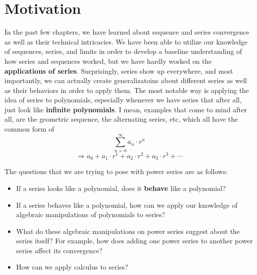 \section{Motivation}
In the past few chapters, we have learned about
sequence and series convergence as well as
their technical intricacies. We have been able to utilize
our knowledge of sequences, series, and limits in order
to develop a baseline understanding of how series and
sequences worked, but we have hardly worked on the
\textbf{applications of series}. Surprisingly, series
show up everywhere, and most importantly, we can
actually create generalizatoins about different series
as well as their behaviors in order to apply them.
The most notable way is applying the idea of series to
polynomials, especially whenever we have series that
after all, just look like \textbf{infinite polynomials}.
I mean, examples that come to mind after all,
are the geometric sequence, the alternating series, etc,
which all have the common form of
\[ \sum_{n=0}^{\infty} a_{n} \cdot r^{n} \]
\[ \Rightarrow a_{0} + a_{1} \cdot r^{1} +
  a_{2} \cdot r^{2} + a_{3} \cdot r^{3} + \cdots \]

The questions that we are trying to pose with power series
are as follows:
\begin{itemize}
  \item If a series looks like a polynomial, does it
        \textbf{behave} like a polynomial?
  \item If a series behaves like a polynomial, how
        can we apply our knowledge of algebraic manipulations
        of polynomials to series?
  \item What do these algebraic manipulations on
        power series suggest about the series itself?
        For example, how does adding one power series
        to another power series affect its
        convergence?
  \item How can we apply calculus to series?

\end{itemize}
